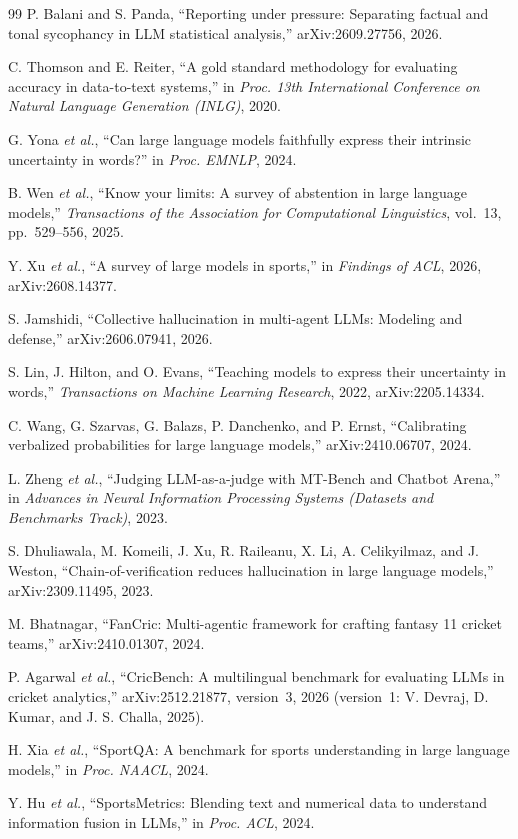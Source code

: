 \documentclass[11pt,a4paper]{article}
\begin{document}
\begin{thebibliography}{99}
P. Balani and S. Panda, ``Reporting under pressure: Separating factual and tonal
sycophancy in LLM statistical analysis,'' arXiv:2609.27756, 2026.

C. Thomson and E. Reiter, ``A gold standard methodology for evaluating accuracy
in data-to-text systems,'' in \emph{Proc. 13th International Conference on
Natural Language Generation (INLG)}, 2020.

G. Yona \emph{et al.}, ``Can large language models faithfully express their
intrinsic uncertainty in words?'' in \emph{Proc. EMNLP}, 2024.

B. Wen \emph{et al.}, ``Know your limits: A survey of abstention in large
language models,'' \emph{Transactions of the Association for Computational
Linguistics}, vol.~13, pp.~529--556, 2025.

Y. Xu \emph{et al.}, ``A survey of large models in sports,'' in \emph{Findings of
ACL}, 2026, arXiv:2608.14377.

S. Jamshidi, ``Collective hallucination in multi-agent LLMs: Modeling and
defense,'' arXiv:2606.07941, 2026.

S. Lin, J. Hilton, and O. Evans, ``Teaching models to express their
uncertainty in words,'' \emph{Transactions on Machine Learning Research}, 2022,
arXiv:2205.14334.

C. Wang, G. Szarvas, G. Balazs, P. Danchenko, and P. Ernst, ``Calibrating
verbalized probabilities for large language models,'' arXiv:2410.06707, 2024.

L. Zheng \emph{et al.}, ``Judging LLM-as-a-judge with MT-Bench and Chatbot
Arena,'' in \emph{Advances in Neural Information Processing Systems (Datasets
and Benchmarks Track)}, 2023.

S. Dhuliawala, M. Komeili, J. Xu, R. Raileanu, X. Li, A. Celikyilmaz, and
J. Weston, ``Chain-of-verification reduces hallucination in large language
models,'' arXiv:2309.11495, 2023.

M. Bhatnagar, ``FanCric: Multi-agentic framework for crafting fantasy 11
cricket teams,'' arXiv:2410.01307, 2024.

P. Agarwal \emph{et al.}, ``CricBench: A multilingual benchmark for evaluating
LLMs in cricket analytics,'' arXiv:2512.21877, version~3, 2026 (version~1:
V. Devraj, D. Kumar, and J. S. Challa, 2025).

H. Xia \emph{et al.}, ``SportQA: A benchmark for sports understanding in large
language models,'' in \emph{Proc. NAACL}, 2024.

Y. Hu \emph{et al.}, ``SportsMetrics: Blending text and numerical data to
understand information fusion in LLMs,'' in \emph{Proc. ACL}, 2024.

\end{thebibliography}
\end{document}
